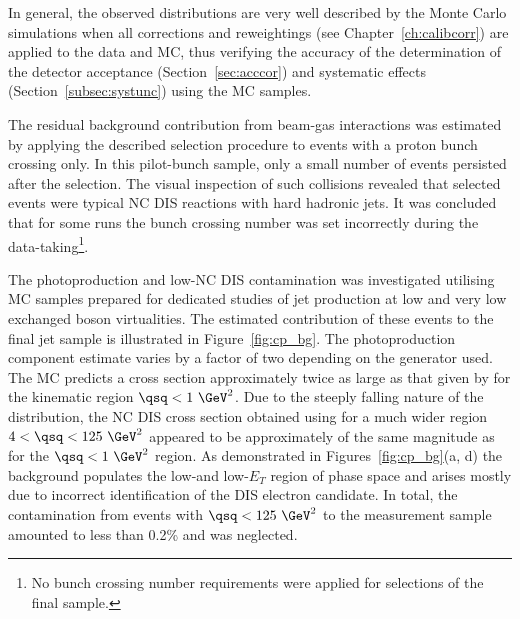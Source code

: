 In general, the observed distributions are very well described by the Monte Carlo simulations when all corrections and reweightings (see Chapter~\ref{ch:calibcorr}) are applied to the data and MC, thus verifying the accuracy of the determination of the detector acceptance (Section~\ref{sec:acccor}) and systematic effects (Section~\ref{subsec:systunc}) using the MC samples.

The residual background contribution from beam-gas interactions was estimated by applying the described selection procedure to events with a proton bunch crossing only. In this pilot-bunch sample, only a small number of events persisted after the selection. The visual inspection of such collisions revealed that selected events were typical NC DIS reactions with hard hadronic jets. It was concluded that for some runs the bunch crossing number was set incorrectly during the data-taking\footnote{No bunch crossing number requirements were applied for selections of the final sample.}.

The photoproduction and low-\qsq NC DIS contamination was investigated utilising MC samples prepared for dedicated studies of jet production at low and very low exchanged boson virtualities. The estimated contribution of these events to the final jet sample is illustrated in Figure~\ref{fig:cp_bg}. The photoproduction component estimate varies by a factor of two depending on the generator used. The \pythia MC predicts a cross section approximately twice as large as that given by \herwig for the kinematic region $\qsq < 1~\GeV^2$. Due to the steeply falling nature of the \qsq distribution, the NC DIS cross section obtained using \lepto for a much wider region $4< \qsq < 125~\GeV^2$ appeared to be approximately of the same magnitude as for the $\qsq < 1~\GeV^2$ region. As demonstrated in Figures~\ref{fig:cp_bg}(a, d) the background populates the low-\qsq and low-$E_T$ region of phase space and arises mostly due to incorrect identification of the DIS electron candidate. In total, the contamination from events with $\qsq < 125~\GeV^2$ to the measurement sample amounted to less than 0.2\% and was neglected.


